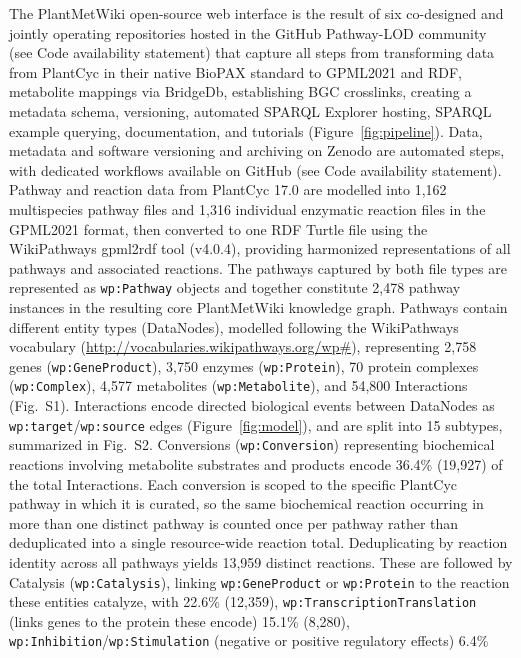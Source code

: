 \documentclass[11pt,a4paper]{article}
\begin{document}
The PlantMetWiki open-source web interface is the result of six co-designed and jointly operating
repositories hosted in the GitHub Pathway-LOD community (see Code availability statement) that
capture all steps from transforming data from PlantCyc in their native BioPAX standard to GPML2021
and RDF, metabolite mappings via BridgeDb, establishing BGC crosslinks, creating a metadata schema,
versioning, automated SPARQL Explorer hosting, SPARQL example querying, documentation, and tutorials
(Figure~\ref{fig:pipeline}). Data, metadata and software versioning and archiving on Zenodo are
automated steps, with dedicated workflows available on GitHub (see Code availability statement).
Pathway and reaction data from PlantCyc 17.0 are modelled into 1,162 multispecies pathway files and
1,316 individual enzymatic reaction files in the GPML2021 format, then converted to one RDF Turtle
file using the WikiPathways gpml2rdf tool (v4.0.4), providing harmonized representations of all
pathways and associated reactions. The pathways captured by both file types are represented as
\texttt{wp:Pathway} objects and together constitute 2,478 pathway instances in the resulting core
PlantMetWiki knowledge graph. Pathways contain different entity types (DataNodes), modelled following
the WikiPathways vocabulary (\url{http://vocabularies.wikipathways.org/wp#}), representing 2,758
genes (\texttt{wp:GeneProduct}), 3,750 enzymes (\texttt{wp:Protein}), 70 protein complexes
(\texttt{wp:Complex}), 4,577 metabolites (\texttt{wp:Metabolite}), and 54,800 Interactions
(Fig.~S1). Interactions encode directed biological events between DataNodes as
\texttt{wp:target}/\texttt{wp:source} edges (Figure~\ref{fig:model}), and are split into 15 subtypes,
summarized in Fig.~S2. Conversions (\texttt{wp:Conversion}) representing biochemical reactions
involving metabolite substrates and products encode 36.4\% (19,927) of the total Interactions.
Each conversion is scoped to the specific PlantCyc pathway in which it is curated, so
the same biochemical reaction occurring in more than one distinct pathway is counted once per pathway
rather than deduplicated into a single resource-wide reaction total. Deduplicating by reaction identity
across all pathways yields 13,959 distinct reactions.
These are followed by Catalysis (\texttt{wp:Catalysis}), linking \texttt{wp:GeneProduct} or \texttt{wp:Protein}
to the reaction these entities catalyze, with 22.6\% (12,359),
\texttt{wp:TranscriptionTranslation} (links genes to the protein these encode) 15.1\% (8,280),
\texttt{wp:Inhibition}/\texttt{wp:Stimulation} (negative or positive regulatory effects) 6.4\%
\end{document}
